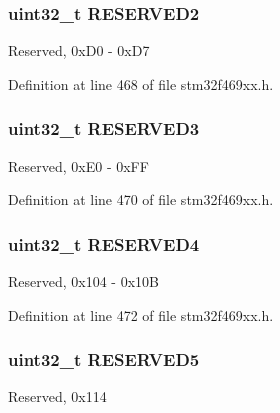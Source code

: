 \subsubsection[{\texorpdfstring{R\+E\+S\+E\+R\+V\+E\+D2}{RESERVED2}}]{\setlength{\rightskip}{0pt plus 5cm}uint32\+\_\+t R\+E\+S\+E\+R\+V\+E\+D2}\hypertarget{struct_d_s_i___type_def_a084078d9f3cece4b4ad554e2c700919f}{}\label{struct_d_s_i___type_def_a084078d9f3cece4b4ad554e2c700919f}
Reserved, 0x\+D0 -\/ 0x\+D7 

Definition at line 468 of file stm32f469xx.\+h.

\subsubsection[{\texorpdfstring{R\+E\+S\+E\+R\+V\+E\+D3}{RESERVED3}}]{\setlength{\rightskip}{0pt plus 5cm}uint32\+\_\+t R\+E\+S\+E\+R\+V\+E\+D3}\hypertarget{struct_d_s_i___type_def_a8c5cc398041224f38803ecf5b544943f}{}\label{struct_d_s_i___type_def_a8c5cc398041224f38803ecf5b544943f}
Reserved, 0x\+E0 -\/ 0x\+FF 

Definition at line 470 of file stm32f469xx.\+h.

\subsubsection[{\texorpdfstring{R\+E\+S\+E\+R\+V\+E\+D4}{RESERVED4}}]{\setlength{\rightskip}{0pt plus 5cm}uint32\+\_\+t R\+E\+S\+E\+R\+V\+E\+D4}\hypertarget{struct_d_s_i___type_def_ab47f7f00aca237787f484db0558735a4}{}\label{struct_d_s_i___type_def_ab47f7f00aca237787f484db0558735a4}
Reserved, 0x104 -\/ 0x10B 

Definition at line 472 of file stm32f469xx.\+h.

\subsubsection[{\texorpdfstring{R\+E\+S\+E\+R\+V\+E\+D5}{RESERVED5}}]{\setlength{\rightskip}{0pt plus 5cm}uint32\+\_\+t R\+E\+S\+E\+R\+V\+E\+D5}\hypertarget{struct_d_s_i___type_def_adb4bebbe6b0ac5c1518bc6efb1086fd9}{}\label{struct_d_s_i___type_def_adb4bebbe6b0ac5c1518bc6efb1086fd9}
Reserved, 0x114 

